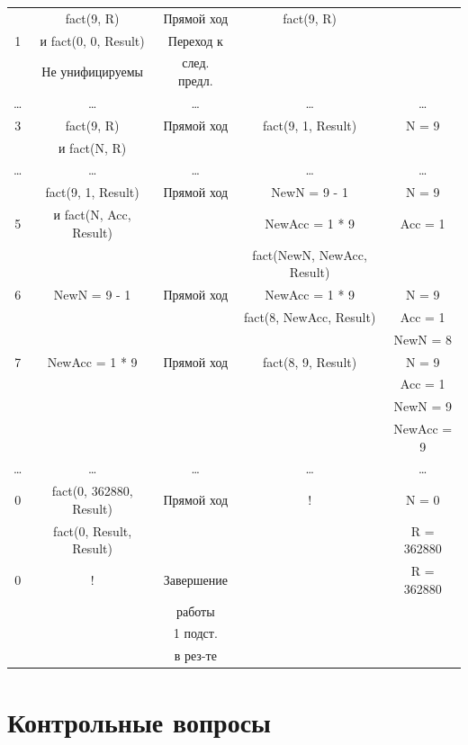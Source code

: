 \begin{landscape}
\begin{longtable}{|c|c|c|c|c|}
        \hline
              & fact(9, R) & Прямой ход & fact(9, R) & \\
            1 & и fact(0, 0, Result) & Переход к & &\\
			  & Не унифицируемы & след. предл. & &\\
			\hline
			\dots & \dots & \dots & \dots & \dots \\
			\hline 
			3 & fact(9, R) & Прямой ход & fact(9, 1, Result) & N = 9\\
              & и fact(N, R) & & &\\
            \hline
			\dots & \dots & \dots & \dots & \dots \\
		    \hline 
			  & fact(9, 1, Result) & Прямой ход & NewN = 9 - 1 & N = 9\\
            5 & и fact(N, Acc, Result) & & NewAcc = 1 * 9 & Acc = 1\\
              & & & fact(NewN, NewAcc, Result) & \\
            \hline 
			6 & NewN = 9 - 1 & Прямой ход & NewAcc = 1 * 9 & N = 9\\
              & & & fact(8, NewAcc, Result) & Acc = 1\\
              & & & & NewN = 8\\
            \hline 
			7 & NewAcc = 1 * 9 & Прямой ход & fact(8, 9, Result) & N = 9\\
              & & & & Acc = 1\\
              & & & & NewN = 9\\
              & & & & NewAcc = 9\\
            \hline
			\dots & \dots & \dots & \dots & \dots \\
            \hline 
			0 & fact(0, 362880, Result) & Прямой ход & ! & N = 0\\
               & fact(0, Result, Result) & & & R = 362880\\
			\hline
            0 & ! & Завершение & & R = 362880 \\
              & & работы & &\\
              & & 1 подст. & & \\
              & & в рез-те & & \\
    \end{longtable}
\end{landscape}

\section*{Контрольные вопросы}

